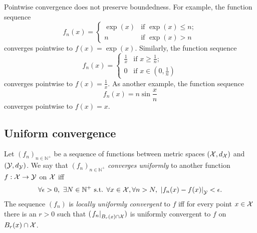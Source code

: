 \begin{exm}
  \label{exm:pointwiseConvergencePreservesNoBoundedness}
  Pointwise convergence does not preserve boundedness.
  For example, the function sequence
  \begin{equation}
    \label{eq:choppedExp}
    f_n(x) =
    \begin{cases}
      \exp(x) & \text{if } \exp(x)\le n;
      \\
      n & \text{if } \exp(x)>n
    \end{cases}
  \end{equation}
  converges pointwise to $f(x)=\exp(x)$. %
  Similarly, the function sequence
  \begin{equation}
    \label{eq:choppedReciprocal}
    f_n(x) =
    \begin{cases}
      \frac{1}{x} & \text{if } x \ge \frac{1}{n};
      \\
      0 & \text{if } x\in (0,\frac{1}{n})
    \end{cases}
  \end{equation}
  converges pointwise to $f(x)=\frac{1}{x}$.
  As another example, the function sequence 
  \begin{equation}
    \label{eq:nSin}
    f_n(x) = n\sin \frac{x}{n}
  \end{equation}
  converges pointwise to $f(x)=x$.
\end{exm}



\subsection{Uniform convergence} %
\label{sec:uniformConvergence}

\begin{defn}
  \label{def:uniformConvergence}
  Let $(f_n)_{n\in\mathbb{N}^+}$ be a sequence of functions
   between metric spaces $({\cal X}, d_{{\cal X}})$
   and $({\cal Y}, d_{{\cal Y}})$.
  We say that $(f_n)_{n\in\mathbb{N}^+}$ \emph{converges uniformly}
  to another function $f:{\cal X}\rightarrow{\cal Y}$
  on ${\cal X}$ iff
   \begin{equation}
     \label{eq:uniformConvergence}
     \forall \epsilon>0,\ 
     \exists N\in \mathbb{N}^+ \text{ s.t. }
     \forall x\in {\cal X}, \forall n>N, \ 
     \left|f_n(x)- f(x)\right|_{{\cal Y}} < \epsilon.
   \end{equation}
  The sequence $(f_n)$ is \emph{locally uniformly convergent} to $f$
   iff for every point $x\in {\cal X}$
   there is an $r>0$
   such that $(\left. f_n\right|_{B_r(x)\cap {\cal X}})$ is
   uniformly convergent to $f$ on $B_r(x)\cap {\cal X}$.
\end{defn}


